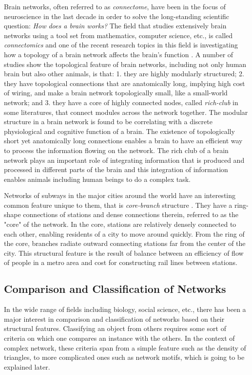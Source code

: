 \documentclass{article}
\begin{document}
Brain networks, often referred to as \textit{connectome}, have been in the focus of neuroscience in the last decade in order to solve the long-standing scientific question: \textit{How does a brain works?}  The field that studies extensively brain networks using a tool set from mathematics, computer science, etc., is called \textit{connectomics} and one of the recent research topics in this field is investigating how a topology of a brain network affects the brain's function \cite{ComparativeConnectome}. A number of studies show the topological feature of brain networks, including not only human brain but also other animals, is that: 1. they are highly modularly structured; 2. they have topological connections that are anatomically long, implying high cost of wiring, and make a brain network topologically small, like a small-world network; and 3. they have a core of highly connected nodes, called \textit{rich-club} in some literatures, that connect modules across the network together. The modular structure in a brain network is found to be correlating with a discrete physiological and cognitive function of a brain. The existence of topologically short yet anatomically long connections enables a brain to have an efficient way to process the information flowing on the network. The rich club of a brain network plays an important role of integrating information that is produced and processed in different parts of the brain and this integration of information enables animals including human beings to do a complex task.

Networks of subways in the major cities around the world have an interesting common feature unique to them, that is \textit{core-branch} structure \cite{Train}. They have a ring-shape connections of stations and dense connections therein, referred to as the "core" of the network. In the core, stations are relatively densely connected to each other, enabling residents of a city to move around quickly. From the ring of the core, branches radiate outward connecting stations far from the center of the city. This structural feature is the result of balance between an efficiency of flow of people in a metro area and cost for constructing rail lines between stations. 


	
	\subsection{Comparison and Classification of Networks}
	In the wide range of fields including biology, social science, etc., there has been a major interest in comparison and classification of networks based on their structural features. Classifying an object from others requires some sort of criteria on which one compares an instance with the others. In the context of complex network, these criteria span from a simple feature such as the density of triangles, to more complicated ones such as network motifs, which is going to be explained later.
	
\end{document}
